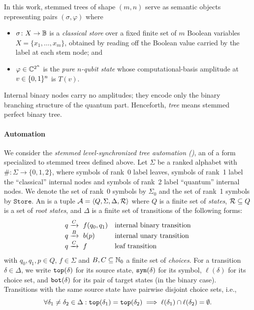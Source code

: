 \documentclass{article}
\begin{document}
In this work, stemmed trees of shape $(m,n)$ serve as semantic objects representing
pairs $(\sigma, \varphi)$ where
\begin{itemize}
    \item $\sigma \colon X \to \mathbb{B}$ is a \emph{classical store} over a fixed finite set
      of $m$ Boolean variables $X = \{x_1, \dots, x_m\}$, obtained by reading off
      the Boolean value carried by the label at each stem node; and
    \item $\varphi \in \mathbb{C}^{2^n}$ is the \emph{pure $n$-qubit state} whose
      computational-basis amplitude at $v \in \{0,1\}^n$ is $T(v)$.
\end{itemize}
Internal binary nodes carry no amplitudes; they encode only the binary branching structure of the quantum part. Henceforth, \emph{tree} means stemmed perfect binary tree.

\paragraph{Automation}
We consider the \emph{stemmed level-synchronized tree automation (\slsta)}, an \lsta of a form specialized to stemmed trees defined above. 
Let $\Sigma$ be a ranked alphabet with $\#: \Sigma \to \{0,1,2\}$, where symbols of rank~0 label leaves, symbols of rank~{1} label the ``classical'' internal nodes and symbols of rank~{2} label ``quantum'' internal nodes.
We denote the set of rank~0 symbols by $\Sigma_0$ and the set of rank~1 symbols by $\mathtt{Store}$. 
An \slsta is a tuple $\mathcal{A} = \langle Q,\Sigma,\Delta,\mathcal{R} \rangle$ where $Q$ is a finite set of \emph{states}, 
$\mathcal{R} \subseteq Q$ is a set of \emph{root states}, and $\Delta$ is a finite set of transitions of the following forms:
\[
\begin{array}{ll}
    {q}\xrightarrow{C}~{f(q_0,q_1)}  &\text{internal binary transition}  \\
    {q}\xrightarrow{B}~{b(p)} &\text{internal unary transition}\\
    {q}\xrightarrow{C}~{f} & \text{leaf transition} \\
\end{array}
\]
with $q_0,q_1,p \in Q$, $f \in \Sigma$ and $B, C \subseteq \mathbb{N}_{0}$ a finite set of \emph{choices}. 
For a transition $\delta \in \Delta$, we write $\mathtt{top}(\delta)$ for its source state, $\mathtt{sym}(\delta)$ for its symbol, 
$\ell(\delta)$ for its choice set,
and $\mathtt{bot}(\delta)$ for its pair of target states (in the binary case).
Transitions with the same source state have pairwise disjoint choice sets, i.e., 
\[
\forall \delta_1 \neq \delta_2 \in \Delta: \mathtt{top}(\delta_1) = \mathtt{top}(\delta_2) \implies \ell(\delta_1) \cap \ell(\delta_2) = \emptyset.
\]
\end{document}
